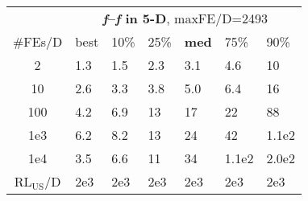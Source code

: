\begin{tabular}{c|llllll}
 & \multicolumn{6}{|c}{\textbf{\textit{f}\raisebox{-0.35ex}{1}--\textit{f}\raisebox{-0.35ex}{24} in 5-D}, maxFE/D=2493}\\
\#FEs/D & best & 10\% & 25\% & \textbf{med} & 75\% & 90\%\\
2 & \hspace*{1ex}1.3 & \hspace*{1ex}1.5 & \hspace*{1ex}2.3 & \hspace*{1ex}3.1 & \hspace*{1ex}4.6 & 10\\
10 & \hspace*{1ex}2.6 & \hspace*{1ex}3.3 & \hspace*{1ex}3.8 & \hspace*{1ex}5.0 & \hspace*{1ex}6.4 & 16\\
100 & \hspace*{1ex}4.2 & \hspace*{1ex}6.9 & 13 & 17 & 22 & 88\\
1e3 & \hspace*{1ex}6.2 & \hspace*{1ex}8.2 & 13 & 24 & 42 & 1.1e2\\
1e4 & \hspace*{1ex}3.5 & \hspace*{1ex}6.6 & 11 & 34 & 1.1e2 & 2.0e2\\
$\text{RL}_{\text{US}}$/D & 2e3 & 2e3 & 2e3 & 2e3 & 2e3 & 2e3
\end{tabular}
